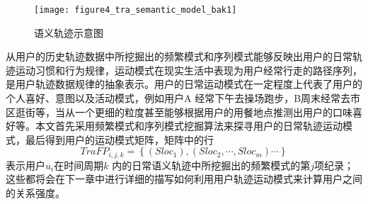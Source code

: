 \begin{figure}[htp]
\centering
\texttt{[image: figure4\_tra\_semantic\_model\_bak1]}
\caption{语义轨迹示意图}
\label{fig:tra_semantic_model}
\end{figure}
\par 从用户的历史轨迹数据中所挖掘出的频繁模式和序列模式能够反映出用户的日常轨迹运动习惯和行为规律，运动模式在现实生活中表现为用户经常行走的路径序列，是用户轨迹数据规律的抽象表示。用户的日常运动模式在一定程度上代表了用户的个人喜好、意图以及活动模式，例如用户A 经常下午去操场跑步，B周末经常去市区逛街等，当从一个更细的粒度甚至能够根据用户的用餐地点推测出用户的口味喜好等。本文首先采用频繁模式和序列模式挖掘算法来探寻用户的日常轨迹运动模式，最后得到用户的运动模式矩阵，矩阵中的行$$TraFP_{i,j,k}=\left \{  (Sloc_{1}),(Sloc_{2}, \cdots ,Sloc_{m})\cdots   \right \}$$ 表示用户$u_{i}$在时间周期$k$ 内的日常语义轨迹中所挖掘出的频繁模式的第$j$项纪录；这些都将会在下一章中进行详细的描写如何利用用户轨迹运动模式来计算用户之间的关系强度。
